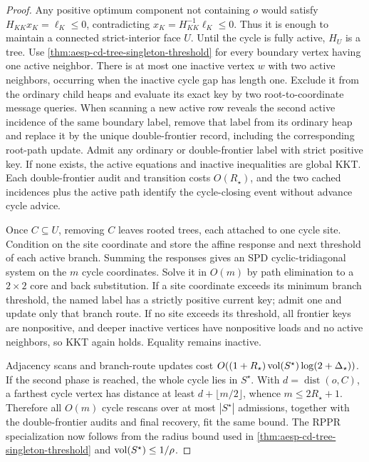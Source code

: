 \begin{proof}
Any positive optimum component not containing $o$ would satisfy
$H_{KK}x_K=\ell_K\leq0$, contradicting
$x_K=H_{KK}^{-1}\ell_K\leq0$.  Thus it is enough to maintain a connected
strict-interior face $U$.  Until the cycle is fully
active, $H_U$ is a tree.  Use
\cref{thm:aesp-cd-tree-singleton-threshold} for every boundary vertex having
one active neighbor.  There is at most one inactive vertex $w$ with two
active neighbors, occurring when the inactive cycle gap has length one.
Exclude it from the ordinary child heaps and evaluate its exact key by two
root-to-coordinate message queries.  When scanning a new active row reveals
the second active incidence of the same boundary label, remove that label
from its ordinary heap and replace it by the unique double-frontier record,
including the corresponding root-path update.  Admit any ordinary or
double-frontier label with strict positive key.  If none exists, the active
equations and inactive inequalities are global KKT.  Each double-frontier
audit and transition costs $O(R_\star)$, and the two cached incidences plus
the active path identify the cycle-closing event without advance cycle
advice.

Once $C\subseteq U$, removing $C$ leaves rooted trees, each attached to one
cycle site.  Condition on the site coordinate and store the affine response
and next threshold of each active branch.  Summing the responses gives an SPD
cyclic-tridiagonal system on the $m$ cycle coordinates.  Solve it in $O(m)$
by path elimination to a $2\times2$ core and back substitution.  If a site
coordinate exceeds its minimum branch threshold, the named label has a
strictly positive current key; admit one and update only that branch route.
If no site exceeds its threshold, all frontier keys are nonpositive, and
deeper inactive vertices have nonpositive loads and no active neighbors, so
KKT again holds.  Equality remains inactive.

Adjacency scans and branch-route updates cost
$O((1+R_\star)\operatorname{vol}(S^\star)\log(2+\Delta_\star))$.  If the second phase is
reached, the whole cycle lies in $S^\star$.  With
$d=\operatorname{dist}(o,C)$, a farthest cycle vertex has distance at least
$d+\lfloor m/2\rfloor$, whence $m\leq2R_\star+1$.  Therefore all
$O(m)$ cycle rescans over at most $|S^\star|$ admissions, together with the
double-frontier audits and final recovery, fit the same bound.  The RPPR
specialization now follows from the radius bound used in
\cref{thm:aesp-cd-tree-singleton-threshold} and
$\operatorname{vol}(S^\star)\leq1/\rho$.
\end{proof}

